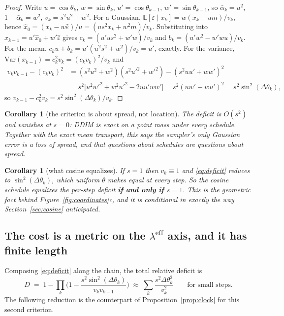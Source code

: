 \documentclass[11pt]{article}
\newtheorem{corollary}[proposition]{Corollary}
\theoremstyle{definition}
\newcommand{\abar}{\bar\alpha}
\newcommand{\Var}{\mathrm{Var}}
\newcommand{\E}{\mathbb{E}}
\newcommand{\leff}{\lambda^{\mathrm{eff}}}
\begin{document}
\begin{proof}
Write $u=\cos\theta_k$, $w=\sin\theta_k$, $u'=\cos\theta_{k-1}$,
$w'=\sin\theta_{k-1}$, so $\abar_k=u^2$, $1-\abar_k=w^2$, $v_k=s^2u^2+w^2$. For a
Gaussian, $\E[\varepsilon\mid x_k]=w(x_k-um)/v_k$, hence
$\hat x_0=(x_k-w\hat\varepsilon)/u=(us^2x_k+w^2m)/v_k$. Substituting into
$x_{k-1}=u'\hat x_0+w'\hat\varepsilon$ gives $c_k=(u'us^2+w'w)/v_k$ and
$b_k=(u'w^2-w'wu)/v_k$. For the mean, $c_ku+b_k=u'(u^2s^2+w^2)/v_k=u'$, exactly.
For the variance, $\Var(x_{k-1})=c_k^2v_k=(c_kv_k)^2/v_k$ and
\begin{align}
  v_kv_{k-1}-(c_kv_k)^2
  &=(s^2u^2+w^2)(s^2u'^2+w'^2)-(s^2uu'+ww')^2\nonumber\\
  &=s^2\big[u^2w'^2+w^2u'^2-2uu'ww'\big]
  =s^2(uw'-wu')^2=s^2\sin^2(\Delta\theta_k),
\end{align}
so $v_{k-1}-c_k^2v_k=s^2\sin^2(\Delta\theta_k)/v_k$.
\end{proof}

\begin{corollary}[the criterion is about spread, not location]
\label{cor:pointmass}
The deficit is $O(s^2)$ and vanishes at $s=0$: DDIM is exact on a point mass
under \emph{every} schedule. Together with the exact mean transport, this says the
sampler's only Gaussian error is a loss of spread, and that questions about
schedules are questions about spread.
\end{corollary}

\begin{corollary}[what cosine equalizes]
\label{cor:cosines1}
If $s=1$ then $v_k\equiv1$ and \eqref{eq:deficit} reduces to
$\sin^2(\Delta\theta_k)$, which uniform $\theta$ makes equal at every step. So
the cosine schedule equalizes the per-step deficit \textbf{if and only if
$s=1$}. This is the geometric fact behind Figure~\ref{fig:coordinates}c, and it
is conditional in exactly the way Section~\ref{sec:cosine} anticipated.
\end{corollary}

\subsection{The cost is a metric on the $\leff$ axis, and it has finite length}

Composing \eqref{eq:deficit} along the chain, the total relative deficit is
\begin{equation}
  D \;=\; 1-\prod_{k}\Big(1-\frac{s^2\sin^2(\Delta\theta_k)}{v_kv_{k-1}}\Big)
    \;\approx\; \sum_k\frac{s^2\Delta\theta_k^2}{v_k^2}
  \qquad\text{for small steps.}
  \label{eq:total}
\end{equation}
The following reduction is the counterpart of Proposition~\ref{prop:clock} for
this second criterion.
\end{document}
